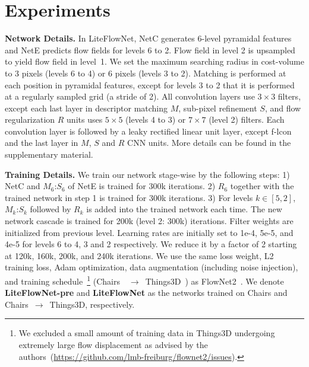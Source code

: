 \documentclass[10pt,twocolumn,letterpaper]{article}
\begin{document}
\section{Experiments}
\label{sec:experiments}
%
\noindent
\textbf{Network Details.} In LiteFlowNet, NetC generates 6-level pyramidal features and NetE predicts flow fields for levels 6 to 2. Flow field in level 2 is upsampled to yield flow field in level~1. 
%
We set the maximum searching radius in cost-volume to 3 pixels (levels 6 to 4) or 6 pixels (levels 3 to 2). Matching is performed at each position in pyramidal features, except for levels 3 to 2 that it is performed at a regularly sampled grid (a stride of 2). 
%
All convolution layers use $3\times3$ filters, except each last layer in descriptor matching $M$, sub-pixel refinement $S$, and flow regularization $R$ units uses $5\times5$ (levels 4 to 3) or $7\times7$ (level 2) filters. 
%
Each convolution layer is followed by a leaky rectified linear unit layer, except f-lcon and the last layer in $M$, $S$ and $R$ CNN units.
%
More details can be found in the supplementary material.

\vspace{0.1cm}
\noindent
\textbf{Training Details.} We train our network stage-wise by the following steps: 1) NetC and $M_{6}$:$S_{6}$ of NetE is trained for 300k iterations. 2) $R_{6}$ together with the trained network in step 1 is trained for 300k iterations. 3) For levels $k \in [5, 2]$, $M_{k}$:$S_{k}$ followed by $R_{k}$ is added into the trained network each time. The new network cascade is trained for 200k (level 2: 300k) iterations. Filter weights are initialized from previous level. 
%
Learning rates are initially set to 1e-4, 5e-5, and 4e-5 for levels 6 to 4, 3 and 2 respectively. We reduce it by a factor of 2 starting at 120k, 160k, 200k, and 240k iterations. We use the same loss weight, L2 training loss, Adam optimization, data augmentation (including noise injection), and training schedule~\footnote{We excluded a small amount of training data in Things3D undergoing extremely large flow displacement as advised by the authors~(\url{https://github.com/lmb-freiburg/flownet2/issues}).} (Chairs~\cite{Fischer15}~$\rightarrow$~Things3D~\cite{Mayer16}) as FlowNet2~\cite{Ilg17}. 
%
We denote \textbf{LiteFlowNet-pre} and \textbf{LiteFlowNet} as the networks trained on Chairs and Chairs~$\rightarrow$~Things3D, respectively. 
\end{document}
